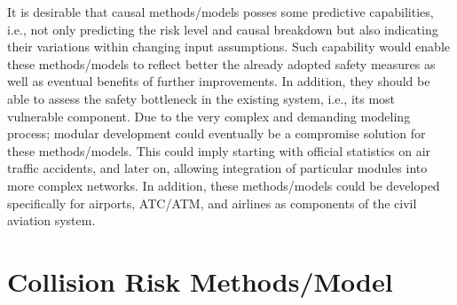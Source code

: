 \documentclass[a4paper, 10pt]{article}
\begin{document}
It is desirable that causal methods/models posses some
predictive capabilities, i.e., not only predicting the risk level
and causal breakdown but also indicating their variations
within changing input assumptions. Such capability would
enable these methods/models to reflect better the already
adopted safety measures as well as eventual benefits of further
improvements. In addition, they should be able to assess the
safety bottleneck in the existing system, i.e., its most
vulnerable component. Due to the very complex and
demanding modeling process; modular development could
eventually be a compromise solution for these methods/models.
This could imply starting with official statistics on air traffic
accidents, and later on, allowing integration of particular
modules into more complex networks. In addition, these
methods/models could be developed specifically for airports,
ATC/ATM, and airlines as components of the civil aviation
system.

\section{Collision Risk Methods/Model}
\end{document}

